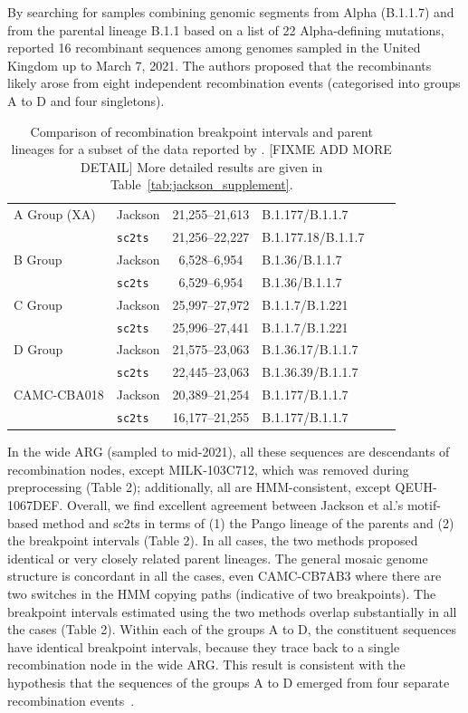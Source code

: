\documentclass{article}
\begin{document}
By searching for samples combining genomic segments from Alpha (B.1.1.7) and from the parental lineage B.1.1 based on a list of 22 Alpha-defining mutations, \citet{Jackson2021-ik} reported 16 recombinant sequences among genomes sampled in the United Kingdom up to March 7, 2021. The authors proposed that the recombinants likely arose from eight independent recombination events (categorised into groups A to D and four singletons).


\begin{table} \centering
\begin{tabular}{ll|clll}
\toprule
A Group (XA) & Jackson        & 21,255–21,613 & B.1.177/B.1.1.7 \\
             & \texttt{sc2ts} &  21,256--22,227 & B.1.177.18/B.1.1.7 \\
\midrule
B Group & Jackson        &  6,528--6,954 & B.1.36/B.1.1.7  \\
        & \texttt{sc2ts} &  6,529--6,954 & B.1.36/B.1.1.7  \\
\midrule
C Group & Jackson        &  25,997--27,972 &  B.1.1.7/B.1.221 \\
        & \texttt{sc2ts} &  25,996--27,441 &  B.1.1.7/B.1.221 \\
\midrule
D Group & Jackson        &  21,575--23,063 &  B.1.36.17/B.1.1.7 \\
        & \texttt{sc2ts} &  22,445--23,063 &  B.1.36.39/B.1.1.7 \\
\midrule
CAMC-CBA018 & Jackson        &  20,389--21,254 & B.1.177/B.1.1.7 \\
            & \texttt{sc2ts} & 16,177--21,255 & B.1.177/B.1.1.7 \\
\midrule
\end{tabular}
\caption{\label{tab:jackson}Comparison of recombination breakpoint intervals and parent lineages for a subset of the data reported by \cite{Jackson2021-ik}. [FIXME ADD MORE DETAIL] More detailed results are given in Table~\ref{tab:jackson_supplement}.}
\end{table}

In the wide ARG (sampled to mid-2021), all these sequences are descendants of recombination nodes, except MILK-103C712, which was removed during preprocessing (Table 2); additionally, all are HMM-consistent, except QEUH-1067DEF. Overall, we find excellent agreement between Jackson et al.’s motif-based method and sc2ts in terms of (1) the Pango lineage of the parents and (2) the breakpoint intervals (Table 2). In all cases, the two methods proposed identical or very closely related parent lineages. The general mosaic genome structure is concordant in all the cases, even CAMC-CB7AB3 where there are two switches in the HMM copying paths (indicative of two breakpoints). The breakpoint intervals estimated using the two methods overlap substantially in all the cases (Table 2). Within each of the groups A to D, the constituent sequences have identical breakpoint intervals, because they trace back to a single recombination node in the wide ARG. This result is consistent with the hypothesis that the sequences of the groups A to D emerged from four separate recombination events~\cite{Jackson2021-ik}.
\end{document}
